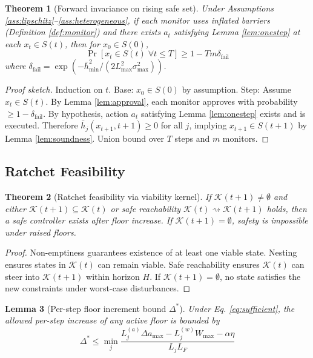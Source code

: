 \documentclass[11pt,a4paper]{article}
\newtheorem{theorem}{Theorem}[section]
\newtheorem{lemma}[theorem]{Lemma}
\theoremstyle{definition}
\newcommand{\K}{\mathcal{K}}
\begin{document}
\begin{theorem}[Forward invariance on rising safe set]\label{thm:forward_inv}
Under Assumptions \ref{ass:lipschitz}--\ref{ass:heterogeneous}, if each monitor uses inflated barriers (Definition \ref{def:monitor}) and there exists $a_t$ satisfying Lemma \ref{lem:onestep} at each $x_t \in S(t)$, then for $x_0 \in S(0)$,
\begin{equation}
\Pr[x_t \in S(t) \;\forall t \leq T] \geq 1 - Tm\delta_{\text{fail}}
\end{equation}
where $\delta_{\text{fail}} = \exp(-\bar{h}_{\min}^2/(2L_{\max}^2 \sigma_{\max}^2))$.
\end{theorem}

\begin{proof}[Proof sketch]
Induction on $t$. Base: $x_0 \in S(0)$ by assumption. Step: Assume $x_t \in S(t)$. By Lemma \ref{lem:approval}, each monitor approves with probability $\geq 1 - \delta_{\text{fail}}$. By hypothesis, action $a_t$ satisfying Lemma \ref{lem:onestep} exists and is executed. Therefore $\bar{h}_j(x_{t+1}, t+1) \geq 0$ for all $j$, implying $x_{t+1} \in S(t+1)$ by Lemma \ref{lem:soundness}. Union bound over $T$ steps and $m$ monitors.
\end{proof}

\subsection{Ratchet Feasibility}

\begin{theorem}[Ratchet feasibility via viability kernel]\label{thm:ratchet}
If $\K(t+1) \neq \emptyset$ and either $\K(t+1) \subseteq \K(t)$ or safe reachability $\K(t) \rightsquigarrow \K(t+1)$ holds, then a safe controller exists after floor increase. If $\K(t+1) = \emptyset$, safety is impossible under raised floors.
\end{theorem}

\begin{proof}
Non-emptiness guarantees existence of at least one viable state. Nesting ensures states in $\K(t)$ can remain viable. Safe reachability ensures $\K(t)$ can steer into $\K(t+1)$ within horizon $H$. If $\K(t+1) = \emptyset$, no state satisfies the new constraints under worst-case disturbances.
\end{proof}

\begin{lemma}[Per-step floor increment bound $\Delta^*$]\label{lem:delta}
Under Eq. \eqref{eq:sufficient}, the allowed per-step increase of any active floor is bounded by
\begin{equation}
\Delta^* \leq \min_j \frac{L_j^{(a)} \Delta a_{\max} - L_j^{(w)} W_{\max} - \alpha\eta}{L_j L_F}
\end{equation}
\end{lemma}
\end{document}
